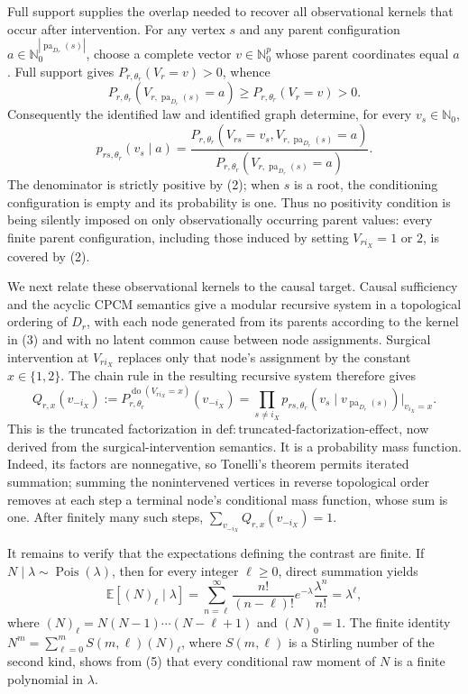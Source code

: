 Full support supplies the overlap needed to recover all observational kernels that occur after intervention.  For any vertex \(s\) and any parent configuration
\(a\in\mathbb N_0^{|\operatorname{pa}_{D_r}(s)|}\), choose a complete vector \(v\in\mathbb N_0^p\) whose parent coordinates equal \(a\).  Full support gives \(P_{r,\theta_r}(V_r=v)>0\), whence
\[
P_{r,\theta_r}\!\left(V_{r,\operatorname{pa}_{D_r}(s)}=a\right)
\geq P_{r,\theta_r}(V_r=v)>0. \tag{2}
\]
Consequently the identified law and identified graph determine, for every \(v_s\in\mathbb N_0\),
\[
p_{rs,\theta_r}(v_s\mid a)
=\frac{P_{r,\theta_r}\!\left(V_{rs}=v_s,
V_{r,\operatorname{pa}_{D_r}(s)}=a\right)}
{P_{r,\theta_r}\!\left(V_{r,\operatorname{pa}_{D_r}(s)}=a\right)}. \tag{3}
\]
The denominator is strictly positive by (2); when \(s\) is a root, the conditioning configuration is empty and its probability is one.  Thus no positivity condition is being silently imposed on only observationally occurring parent values: every finite parent configuration, including those induced by setting \(V_{r i_X}=1\) or \(2\), is covered by (2).

We next relate these observational kernels to the causal target.  Causal sufficiency and the acyclic CPCM semantics give a modular recursive system in a topological ordering of \(D_r\), with each node generated from its parents according to the kernel in (3) and with no latent common cause between node assignments.  Surgical intervention at \(V_{r i_X}\) replaces only that node's assignment by the constant \(x\in\{1,2\}\).  The chain rule in the resulting recursive system therefore gives
\[
Q_{r,x}(v_{-i_X})
:=P_{r,\theta_r}^{\operatorname{do}(V_{r i_X}=x)}(v_{-i_X})
=\prod_{s\ne i_X}
p_{rs,\theta_r}\!\left(v_s\mid
v_{\operatorname{pa}_{D_r}(s)}\right)
\Big|_{v_{i_X}=x}. \tag{4}
\]
This is the truncated factorization in \(\mathrm{def{:}truncated\text{-}factorization\text{-}effect}\), now derived from the surgical-intervention semantics.  It is a probability mass function.  Indeed, its factors are nonnegative, so Tonelli's theorem permits iterated summation; summing the nonintervened vertices in reverse topological order removes at each step a terminal node's conditional mass function, whose sum is one.  After finitely many such steps, \(\sum_{v_{-i_X}}Q_{r,x}(v_{-i_X})=1\).

It remains to verify that the expectations defining the contrast are finite.  If \(N\mid\lambda\sim\operatorname{Pois}(\lambda)\), then for every integer \(\ell\geq0\), direct summation yields
\[
\mathbb E[(N)_{\ell}\mid\lambda]
=\sum_{n=\ell}^{\infty}
\frac{n!}{(n-\ell)!}e^{-\lambda}\frac{\lambda^n}{n!}
=\lambda^{\ell}, \tag{5}
\]
where \((N)_{\ell}=N(N-1)\cdots(N-\ell+1)\) and \((N)_0=1\).  The finite identity
\(N^m=\sum_{\ell=0}^{m}S(m,\ell)(N)_{\ell}\), where \(S(m,\ell)\) is a Stirling number of the second kind, shows from (5) that every conditional raw moment of \(N\) is a finite polynomial in \(\lambda\).

